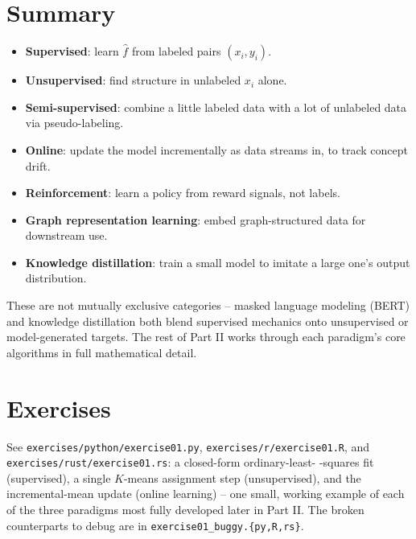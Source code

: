 \documentclass[11pt]{article}
\begin{document}
\section{Summary}
\begin{summarybox}
\begin{itemize}[nosep]
  \item \textbf{Supervised}: learn $\hat f$ from labeled pairs $(x_i, y_i)$.
  \item \textbf{Unsupervised}: find structure in unlabeled $x_i$ alone.
  \item \textbf{Semi-supervised}: combine a little labeled data with a lot
        of unlabeled data via pseudo-labeling.
  \item \textbf{Online}: update the model incrementally as data streams in,
        to track concept drift.
  \item \textbf{Reinforcement}: learn a policy from reward signals, not
        labels.
  \item \textbf{Graph representation learning}: embed graph-structured data
        for downstream use.
  \item \textbf{Knowledge distillation}: train a small model to imitate a
        large one's output distribution.
\end{itemize}
These are not mutually exclusive categories -- masked language modeling
(BERT) and knowledge distillation both blend supervised mechanics onto
unsupervised or model-generated targets. The rest of Part II works through
each paradigm's core algorithms in full mathematical detail.
\end{summarybox}

\section{Exercises}
See \texttt{exercises/python/exercise01.py}, \texttt{exercises/r/exercise01.R},
and \texttt{exercises/rust/exercise01.rs}: a closed-form ordinary-least-
-squares fit (supervised), a single $K$-means assignment step
(unsupervised), and the incremental-mean update (online learning) --
one small, working example of each of the three paradigms most fully
developed later in Part II. The broken counterparts to debug are in
\texttt{exercise01\_buggy.\{py,R,rs\}}.
\end{document}
